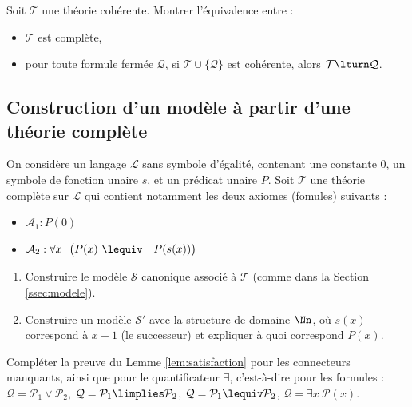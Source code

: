 \documentclass[11pt,class=report,crop=false]{standalone}
\begin{document}
\begin{exercicecours}
	Soit $\mathcal{T}$ une théorie cohérente. Montrer l'équivalence entre :
	\begin{itemize}
		\item[(i)] $\mathcal{T}$ est complète,
		
		\item[(ii)] pour toute formule fermée $\mathcal{Q}$, si $\mathcal{T} \cup \{\mathcal{Q}\}$ est cohérente, alors $\mathcal{T} \lturn \mathcal{Q}$.
	\end{itemize}
\end{exercicecours}


\subsection*{Construction d'un modèle à partir d'une théorie complète}

\begin{exercicecours}
	On considère un langage $\mathcal{L}$ sans symbole d'égalité, contenant une constante $0$, un symbole de fonction unaire $s$, et un prédicat unaire $P$.
	Soit $\mathcal{T}$ une théorie complète sur $\mathcal{L}$ qui contient notamment les deux axiomes (fomules) suivants :
	\begin{itemize}
		\item $\mathcal{A}_1 : P(0)$
		\item $\mathcal{A}_2 : \forall x \ \  \big( P(x) \  \lequiv \ \lnot P(s(x)) \big)$
	\end{itemize}
	
	\begin{enumerate}
		\item Construire le modèle $\mathcal{S}$ canonique associé à $\mathcal{T}$ (comme dans la Section \ref{ssec:modele}).
		
		\item Construire un modèle $\mathcal{S}'$ avec la structure de domaine $\Nn$, 
		où $s(x)$ correspond à $x+1$ (le successeur) et expliquer à quoi correspond $P(x)$.	
	\end{enumerate}

\end{exercicecours}


\begin{exercicecours}
Compléter la preuve du Lemme \ref{lem:satisfaction} pour les connecteurs manquants, ainsi que pour le quantificateur $\exists$, c'est-à-dire pour les formules :
$\mathcal{Q} = \mathcal{P}_1 \lor \mathcal{P}_2$, 
$\mathcal{Q} = \mathcal{P}_1 \limplies \mathcal{P}_2$, 
$\mathcal{Q} = \mathcal{P}_1 \lequiv \mathcal{P}_2$, 
$\mathcal{Q} = \exists x \ \mathcal{P}(x)$. 
\end{exercicecours}
\end{document}
